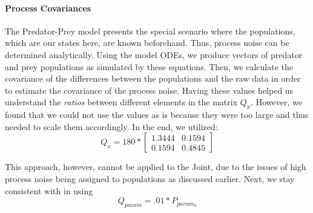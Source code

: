 \paragraph{Process Covariances}
The Predator-Prey model presents the special scenario where the populations, which are our states here, are known beforehand. Thus, process noise can be determined analytically. Using the model ODEs, we produce vectors of predator and prey populations as simulated by these equations. Then, we calculate the covariance of the differences between the populations and the raw data in order to estimate the covariance of the process noise. Having these values helped us understand the \emph{ratios} between different elements in the matrix $Q_x$. However, we found that we could not use the values as is because they were too large and thus needed to scale them accordingly. In the end, we utilized:
\begin{equation}
Q_{x} = 180 * \begin{bmatrix} 1.3444 & 0.1594\\ 0.1594 & 0.4845\end{bmatrix}
\end{equation}

This approach, however, cannot be applied to the Joint, due to the issues of high process noise being assigned to populations as discussed earlier. Next, we stay consistent with \cite{GoveHollingerDual} in using
\begin{equation}
 Q_{param} = .01 * P_{param_0} 
\end{equation}


